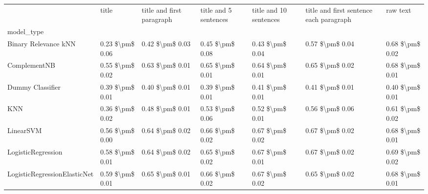 \begin{tabular}{lllllll}
\toprule
{} &            title & title and first paragraph & title and 5 sentences & title and 10 sentences & title and first sentence each paragraph &         raw text \\
model\_type                      &                  &                           &                       &                        &                                         &                  \\
\midrule
Binary Relevance kNN            &  0.23 \$\textbackslash pm\$ 0.06 &           0.42 \$\textbackslash pm\$ 0.03 &       0.45 \$\textbackslash pm\$ 0.08 &        0.43 \$\textbackslash pm\$ 0.04 &                         0.57 \$\textbackslash pm\$ 0.04 &  0.68 \$\textbackslash pm\$ 0.02 \\
ComplementNB                    &  0.55 \$\textbackslash pm\$ 0.02 &           0.63 \$\textbackslash pm\$ 0.01 &       0.65 \$\textbackslash pm\$ 0.01 &        0.64 \$\textbackslash pm\$ 0.01 &                         0.65 \$\textbackslash pm\$ 0.02 &  0.68 \$\textbackslash pm\$ 0.01 \\
Dummy Classifier                &  0.39 \$\textbackslash pm\$ 0.01 &           0.40 \$\textbackslash pm\$ 0.01 &       0.39 \$\textbackslash pm\$ 0.01 &        0.41 \$\textbackslash pm\$ 0.01 &                         0.41 \$\textbackslash pm\$ 0.01 &  0.40 \$\textbackslash pm\$ 0.01 \\
KNN                             &  0.36 \$\textbackslash pm\$ 0.02 &           0.48 \$\textbackslash pm\$ 0.01 &       0.53 \$\textbackslash pm\$ 0.06 &        0.52 \$\textbackslash pm\$ 0.01 &                         0.56 \$\textbackslash pm\$ 0.06 &  0.61 \$\textbackslash pm\$ 0.02 \\
LinearSVM                       &  0.56 \$\textbackslash pm\$ 0.00 &           0.64 \$\textbackslash pm\$ 0.02 &       0.66 \$\textbackslash pm\$ 0.02 &        0.67 \$\textbackslash pm\$ 0.02 &                         0.67 \$\textbackslash pm\$ 0.02 &  0.68 \$\textbackslash pm\$ 0.01 \\
LogisticRegression              &  0.58 \$\textbackslash pm\$ 0.01 &           0.64 \$\textbackslash pm\$ 0.02 &       0.65 \$\textbackslash pm\$ 0.02 &        0.67 \$\textbackslash pm\$ 0.01 &                         0.67 \$\textbackslash pm\$ 0.02 &  0.69 \$\textbackslash pm\$ 0.02 \\
LogisticRegressionElasticNet    &  0.59 \$\textbackslash pm\$ 0.01 &           0.65 \$\textbackslash pm\$ 0.01 &       0.66 \$\textbackslash pm\$ 0.02 &        0.67 \$\textbackslash pm\$ 0.02 &                         0.65 \$\textbackslash pm\$ 0.02 &  0.68 \$\textbackslash pm\$ 0.01 \\

\end{tabular}
